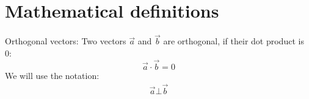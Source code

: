 
\chapter{Mathematical definitions} %

\label{AppendixB} %

\theoremstyle{definition}
\begin{definition}{Orthogonal vectors: }\label{OrthogonalVec}
Two vectors $\overrightarrow{a}$ and $\overrightarrow{b}$ are orthogonal, if their dot product is 0:
$$\overrightarrow{a} \cdot \overrightarrow{b} = 0$$
We will use the notation:
\begin{equation}
\begin{split}
\overrightarrow{a} \bot \overrightarrow{b}
\end{split}
\end{equation}
\end{definition}